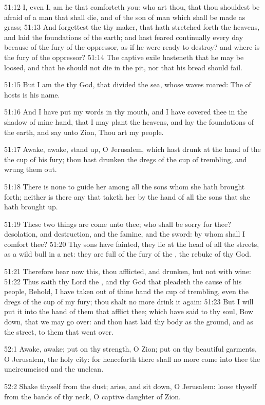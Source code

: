 51:12 I, even I, am he that comforteth you: who art thou, that thou
shouldest be afraid of a man that shall die, and of the son of man
which shall be made as grass; 51:13 And forgettest the \LORD thy maker,
that hath stretched forth the heavens, and laid the foundations of the
earth; and hast feared continually every day because of the fury of
the oppressor, as if he were ready to destroy? and where is the fury
of the oppressor?  51:14 The captive exile hasteneth that he may be
loosed, and that he should not die in the pit, nor that his bread
should fail.

51:15 But I am the \LORD thy God, that divided the sea, whose waves
roared: The \LORD of hosts is his name.

51:16 And I have put my words in thy mouth, and I have covered thee in
the shadow of mine hand, that I may plant the heavens, and lay the
foundations of the earth, and say unto Zion, Thou art my people.

51:17 Awake, awake, stand up, O Jerusalem, which hast drunk at the
hand of the \LORD the cup of his fury; thou hast drunken the dregs of
the cup of trembling, and wrung them out.

51:18 There is none to guide her among all the sons whom she hath
brought forth; neither is there any that taketh her by the hand of all
the sons that she hath brought up.

51:19 These two things are come unto thee; who shall be sorry for
thee?  desolation, and destruction, and the famine, and the sword: by
whom shall I comfort thee?  51:20 Thy sons have fainted, they lie at
the head of all the streets, as a wild bull in a net: they are full of
the fury of the \LORD, the rebuke of thy God.

51:21 Therefore hear now this, thou afflicted, and drunken, but not
with wine: 51:22 Thus saith thy Lord the \LORD, and thy God that
pleadeth the cause of his people, Behold, I have taken out of thine
hand the cup of trembling, even the dregs of the cup of my fury; thou
shalt no more drink it again: 51:23 But I will put it into the hand of
them that afflict thee; which have said to thy soul, Bow down, that we
may go over: and thou hast laid thy body as the ground, and as the
street, to them that went over.

52:1 Awake, awake; put on thy strength, O Zion; put on thy beautiful
garments, O Jerusalem, the holy city: for henceforth there shall no
more come into thee the uncircumcised and the unclean.

52:2 Shake thyself from the dust; arise, and sit down, O Jerusalem:
loose thyself from the bands of thy neck, O captive daughter of Zion.

